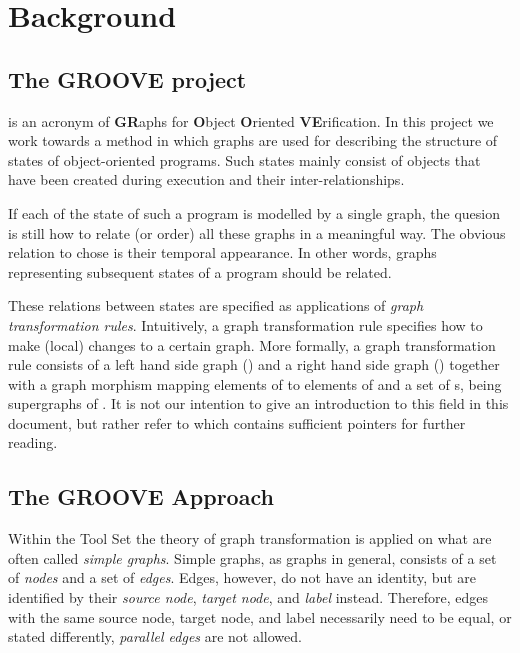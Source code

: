 \chapter{Background}


\section{The GROOVE project}

\GROOVE is an acronym of {\bf GR}aphs for {\bf O}bject {\bf O}riented {\bf VE}rification. In this project we work towards a method in which graphs are used for describing the structure of states of object-oriented programs. Such states mainly consist of objects that have been created during execution and their inter-relationships.

If each of the state of such a program is modelled by a single graph, the quesion is still how to relate (or order) all these graphs in a meaningful way. The obvious relation to chose is their temporal appearance. In other words, graphs representing subsequent states of a program should be related.

These relations between states are specified as applications of {\em graph transformation rules}. Intuitively, a graph transformation rule specifies how to make (local) changes to a certain graph. More formally, a graph transformation rule consists of a left hand side graph (\lhs) and a right hand side graph (\rhs) together with a graph morphism mapping elements of \lhs to elements of \rhs and a set of {\nac}s, being supergraphs of \lhs. It is not our intention to give an introduction to this field in this document, but rather refer to \cite{Heckel2006} which contains sufficient pointers for further reading.


\section{The GROOVE Approach}

Within the \GROOVE Tool Set the theory of graph transformation is applied on what are often called {\em simple graphs}. Simple graphs, as graphs in general, consists of a set of {\em nodes} and a set of {\em edges}. Edges, however, do not have an identity, but are identified by their {\em source node}, {\em target node}, and {\em label} instead. Therefore, edges with the same source node, target node, and label necessarily need to be equal, or stated differently, {\em parallel edges} are not allowed.

